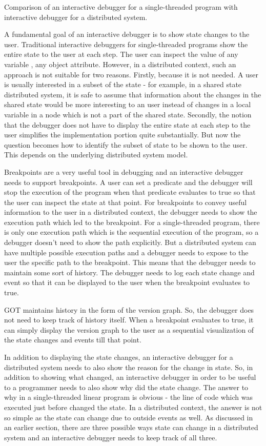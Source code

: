 

Comparison of an interactive debugger for a single-threaded program with interactive debugger for a distributed system.

A fundamental goal of an interactive debugger is to show state changes to the user. Traditional interactive debuggers for  single-threaded programs show the entire state to the user at each step. The user can inspect the value of any variable , any object attribute.  However, in a distributed context, such an approach is not suitable for two reasons. Firstly, because it is not needed. A user is usually interested in a subset of the state - for example, in a shared state distributed system, it is safe to assume that information about the changes in the shared state would be more interesting to an user instead of changes in a local variable in a node which is not a part of the shared state. Secondly, the notion that the debugger does not have to display the entire state at each step to the user simplifies the implementation portion quite substantially. But now the question becomes how to identify the subset of state to be shown to the user. This depends on the underlying distributed system model. 


Breakpoints are a very useful tool in debugging and an interactive debugger needs to support breakpoints. A user can set a predicate and the debugger will stop the execution of the program when that predicate evaluates to true so that the user can inspect the state at that point. For breakpoints to convey useful information to the user in a distributed context, the debugger needs to show the execution path which led to the breakpoint. For a single-threaded program, there is only one execution path which is the sequential execution of the program, so a debugger doesn't need to show the path explicitly. But a distributed system can have multiple possible execution paths and a debugger needs to expose to the user the specific path to the breakpoint. This means that the debugger needs to maintain some sort of history. The debugger needs to log each state change and event so that it can be displayed to the user when the breakpoint evaluates to true.

GOT maintains history in the form of the version graph. So, the debugger does not need to keep track of history itself. When a breakpoint evaluates to true, it can simply display the version graph to the user as a sequential visualization of the state changes and events till that point.


In addition to displaying the state changes, an interactive debugger for a distributed system needs to also show the reason for the change in state. So, in addition to showing what changed, an interactive debugger in order to be useful to a programmer needs to also show why did the state change. The answer to why in a single-threaded linear program is obvious - the line of code which was executed just before changed the state. In a distributed context, the answer is not so simple as the state can change due to outside events as well. As discussed in an earlier section, there are three possible ways state can change in a distributed system and an interactive debugger needs to keep track of all three. 


